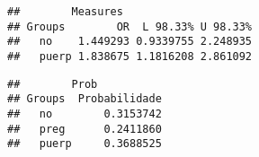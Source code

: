 \documentclass[
]{article}
\newenvironment{Shaded}{\begin{snugshade}}{\end{snugshade}}
\newcommand{\CommentTok}[1]{\textcolor[rgb]{0.56,0.35,0.01}{\textit{#1}}}
\newcommand{\KeywordTok}[1]{\textcolor[rgb]{0.13,0.29,0.53}{\textbf{#1}}}
\newcommand{\NormalTok}[1]{#1}
\newcommand{\OperatorTok}[1]{\textcolor[rgb]{0.81,0.36,0.00}{\textbf{#1}}}
\begin{document}
\begin{verbatim}
##        Measures
## Groups        OR  L 98.33% U 98.33%
##   no    1.449293 0.9339755 2.248935
##   puerp 1.838675 1.1816208 2.861092
\end{verbatim}

\begin{Shaded}
\end{Shaded}

\begin{verbatim}
##        Prob
## Groups  Probabilidade
##   no        0.3153742
##   preg      0.2411860
##   puerp     0.3688525
\end{verbatim}
\end{document}
